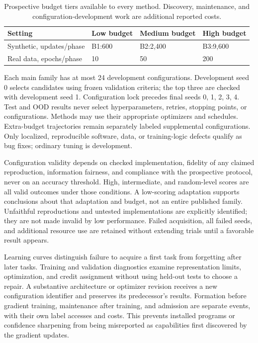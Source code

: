 \begin{table}[t]
\centering
\small
\begin{tabular}{llll}
\toprule
Setting & Low budget & Medium budget & High budget\\
\midrule
Synthetic, updates/phase & B1:600 & B2:2,400 & B3:9,600\\
Real data, epochs/phase &10&50&200\\
\bottomrule
\end{tabular}
\caption{Prospective budget tiers available to every method. Discovery,
maintenance, and configuration-development work are additional reported costs.}
\label{tab:main-training-budgets}
\end{table}

Each main family has at most 24 development configurations. Development seed 0
selects candidates using frozen validation criteria; the top three are checked
with development seed 1. Configuration lock precedes final seeds 0, 1, 2, 3, 4.
Test and OOD results never select hyperparameters, retries, stopping points,
or configurations. Methods may use their appropriate optimizers and schedules.
Extra-budget trajectories remain separately labeled supplemental configurations.
Only localized, reproducible software, data, or training-logic defects qualify
as bug fixes; ordinary tuning is development.

Configuration validity depends on checked implementation, fidelity of any
claimed reproduction, information fairness, and compliance with the prospective
protocol, never on an accuracy threshold. High, intermediate, and random-level
scores are all valid outcomes under those conditions. A low-scoring adaptation
supports conclusions about that adaptation and budget, not an entire published
family. Unfaithful reproductions and untested implementations are explicitly
identified; they are not made invalid by low performance. Failed acquisition,
all failed seeds, and additional resource use are retained without extending
trials until a favorable result appears.

Learning curves distinguish failure to acquire a first task from forgetting
after later tasks. Training and validation diagnostics examine representation
limits, optimization, and credit assignment without using held-out tests to
choose a repair. A substantive architecture or optimizer revision receives a
new configuration identifier and preserves its predecessor's results. Formation
before gradient training, maintenance after training, and admission are separate
events, with their own label accesses and costs. This prevents installed
programs or confidence sharpening from being misreported as capabilities first
discovered by the gradient updates.

